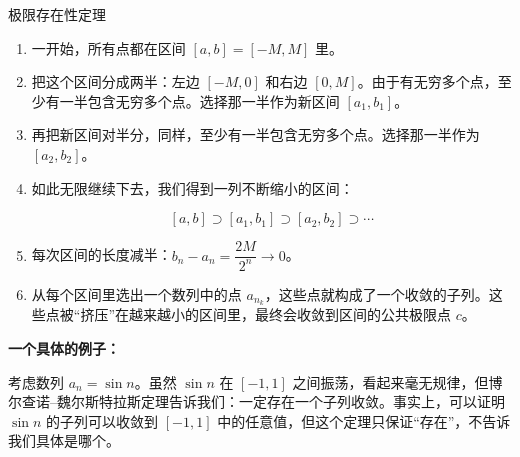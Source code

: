 \documentclass[aspectratio=169,10pt,fontset=fandol]{ctexbeamer}
\begin{document}
\begin{frame}[t,fragile]{极限存在性定理}
{\begin{enumerate}

\item 一开始，所有点都在区间 \([a, b] = [-M, M]\) 里。

\item 把这个区间分成两半：左边 \([-M, 0]\) 和右边 \([0, M]\)。由于有无穷多个点，至少有一半包含无穷多个点。选择那一半作为新区间 \([a_1, b_1]\)。

\item 再把新区间对半分，同样，至少有一半包含无穷多个点。选择那一半作为 \([a_2, b_2]\)。

\item 如此无限继续下去，我们得到一列不断缩小的区间：

\[

[a, b] \supset [a_1, b_1] \supset [a_2, b_2] \supset \cdots

\]

\item 每次区间的长度减半：\(b_n - a_n = \dfrac{2M}{2^n} \to 0\)。

\item 从每个区间里选出一个数列中的点 \(a_{n_k}\)，这些点就构成了一个收敛的子列。这些点被“挤压”在越来越小的区间里，最终会收敛到区间的公共极限点 \(c\)。

\end{enumerate}



\textbf{一个具体的例子：}



考虑数列 \(a_n = \sin n\)。虽然 \(\sin n\) 在 \([-1, 1]\) 之间振荡，看起来毫无规律，但博尔查诺--魏尔斯特拉斯定理告诉我们：一定存在一个子列收敛。事实上，可以证明 \(\sin n\) 的子列可以收敛到 \([-1, 1]\) 中的任意值，但这个定理只保证“存在”，不告诉我们具体是哪个。




}
\end{frame}
\end{document}
